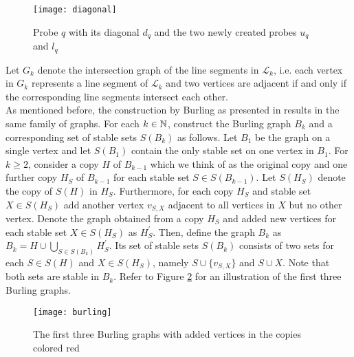 \begin{figure}[ht]
\begin{center}
\texttt{[image: diagonal]}
\end{center}
\caption{Probe $q$ with its diagonal $d_q$ and the two newly created probes $u_q$ and $l_q$}
\label{f2ls}
\end{figure}


Let $G_k$ denote the intersection graph of the line segments in $\mathcal{L}_k$, i.e. each vertex in $G_k$ represents a line segment of $\mathcal{L}_k$ and two vertices are adjacent if and only if the corresponding line segments intersect each other.\\

As mentioned before, the construction by Burling as presented in \cite{Fe18} results in the same family of graphs. For each $k\in\mathbb{N}$, construct the Burling graph $B_k$ and a corresponding set of stable sets $S(B_k)$ as follows. Let $B_1$ be the graph on a single vertex and let $S(B_1)$ contain the only stable set on one vertex in $B_1$. For $k\geq 2$, consider a copy $H$ of $B_{k-1}$ which we think of as the original copy and one further copy $H_S$ of $B_{k-1}$ for each stable set $S\in S(B_{k-1})$. Let $S(H_S)$ denote the copy of $S(H)$ in $H_S$. Furthermore, for each copy $H_S$ and stable set $X\in S(H_S)$ add another vertex $v_{S,X}$ adjacent to all vertices in $X$ but no other vertex. Denote the graph obtained from a copy $H_S$ and added new vertices for each stable set $X\in S(H_S)$ as $H_S^{\prime}$. Then, define the graph $B_k$ as $B_k=H\cup\bigcup_{S\in S(B_k)} H_S^{\prime}$. Its set of stable sets $S(B_k)$ consists of two sets for each $S\in S(H)$ and $X\in S(H_S)$, namely $S\cup \lbrace v_{S,X}\rbrace$ and $S\cup X$. Note that both sets are stable in $B_k$. Refer to Figure \ref{f4ls} for an illustration of the first three Burling graphs.

\begin{figure}[ht]
\begin{center}
\texttt{[image: burling]}
\end{center}
\caption{The first three Burling graphs with added vertices in the copies colored red}
\label{f4ls}
\end{figure}

